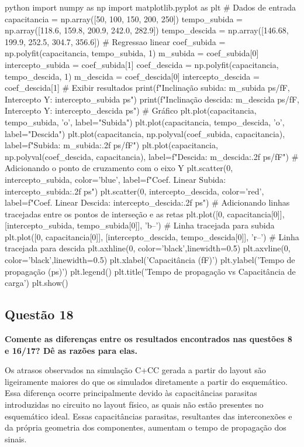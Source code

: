 \documentclass[12pt,a4paper]{article}
\begin{document}
\begin{codeblockm}{python}
import numpy as np
import matplotlib.pyplot as plt
# Dados de entrada
capacitancia = np.array([50, 100, 150, 200, 250])
tempo_subida = np.array([118.6, 159.8, 200.9, 242.0, 282.9])
tempo_descida = np.array([146.68, 199.9, 252.5, 304.7, 356.6])
# Regressao linear
coef_subida = np.polyfit(capacitancia, tempo_subida, 1)
m_subida = coef_subida[0]
intercepto_subida = coef_subida[1]
coef_descida = np.polyfit(capacitancia, tempo_descida, 1)
m_descida = coef_descida[0]
intercepto_descida = coef_descida[1]
# Exibir resultados
print(f"Inclinação subida: {m_subida} ps/fF, Intercepto Y: {intercepto_subida} ps")
print(f"Inclinação descida: {m_descida} ps/fF, Intercepto Y: {intercepto_descida} ps")
# Gráfico
plt.plot(capacitancia, tempo_subida, 'o', label="Subida")
plt.plot(capacitancia, tempo_descida, 'o', label="Descida")
plt.plot(capacitancia, np.polyval(coef_subida, capacitancia),
label=f"Subida: {m_subida:.2f} ps/fF")
plt.plot(capacitancia, np.polyval(coef_descida, capacitancia),
label=f"Descida: {m_descida:.2f} ps/fF")
# Adicionando o ponto de cruzamento com o eixo Y
plt.scatter(0, intercepto_subida, color='blue', label=f"Coef. Linear Subida: {intercepto_subida:.2f} ps")
plt.scatter(0, intercepto_descida, color='red', label=f"Coef. Linear Descida: {intercepto_descida:.2f} ps")
# Adicionando linhas tracejadas entre os pontos de interseção e as retas
plt.plot([0, capacitancia[0]], [intercepto_subida, tempo_subida[0]], 'b--')
# Linha tracejada para subida
plt.plot([0, capacitancia[0]], [intercepto_descida, tempo_descida[0]],
'r--') # Linha tracejada para descida
plt.axhline(0, color='black',linewidth=0.5)
plt.axvline(0, color='black',linewidth=0.5)
plt.xlabel('Capacitância (fF)')
plt.ylabel('Tempo de propagação (ps)')
plt.legend()
plt.title('Tempo de propagação vs Capacitância de carga')
plt.show()
\end{codeblockm}

\subsection*{Questão 18}

	\textbf{Comente as diferenças entre os resultados encontrados nas questões 8 e 16/17? Dê as razões para elas.}

Os atrasos observados na simulação C+CC gerada a partir do layout são ligeiramente maiores do que os simulados diretamente a partir do esquemático. Essa diferença ocorre principalmente devido às capacitâncias parasitas introduzidas no circuito no layout físico, as quais não estão presentes no esquemático ideal. Essas capacitâncias parasitas, resultantes das interconexões e da própria geometria dos componentes, aumentam o tempo de propagação dos sinais.
\end{document}
